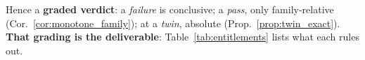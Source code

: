 Hence a \textbf{graded verdict}: a \emph{failure} is conclusive; a \emph{pass}, only family-relative (Cor.~\ref{cor:monotone_family}); at a \emph{twin}, absolute (Prop.~\ref{prop:twin_exact}). \textbf{That grading is the deliverable}: Table~\ref{tab:entitlements} lists what each rules out.

